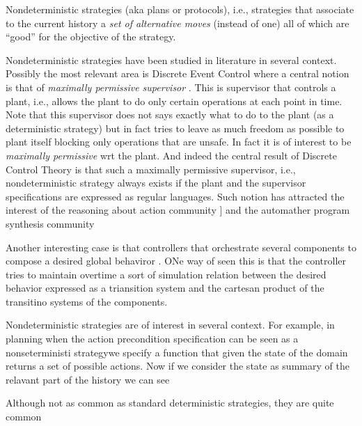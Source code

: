 Nondeterministic strategies (aka plans or protocols), i.e., strategies that associate to the current history a \emph{set of alternative moves} (instead of one) all of which are ``good'' for the objective of the strategy.

Nondeterministic strategies have been studied in literature in several
context.
Possibly the most relevant area is Discrete Event Control where a
central notion is that of \emph{maximally permissive supervisor}
\cite{WonhamRamadge:SIAMJCO87,Cassandras:BOOK06_DES,Wo14}. This is
supervisor that controls a plant, i.e., allows the plant to do only
certain operations at each point in time. Note that this supervisor
does not says exactly what to do to the plant (as a deterministic
strategy) but in fact tries to leave as much freedom as possible to
plant itself blocking only operations that are unsafe. In fact it is
of interest to be \emph{maximally permissive} wrt the plant. And
indeed the central result of Discrete Control Theory is that such a
maximally permissive supervisor, i.e., nondeterministic strategy
always exists if the plant and the supervisor specifications are
expressed as regular languages. Such notion has attracted the interest
of the reasoning about action community
]\cite{DeGiacomoLM12,BanihashemiGL-AAMAS18} and the automather program
synthesis community \cite{pnueli1989synthesisshort,EhlersLTV17}


Another interesting case is that controllers that orchestrate several components to compose a desired global behaviror \cite{Sardina,Logan}. ONe way of seen this is that the controller tries to maintain overtime a sort of simulation relation between the desired behavior expressed as a triansition system and the cartesan product of the transitino systems of the components.


Nondeterministic strategies are of interest in several context. For example, in planning when the action precondition specification can be seen as a nonseterministi strategywe specify a function that given the state of the domain returns a set of possible actions. Now if we consider the state as summary of the relavant part of the history we can see  


Although not as common as standard deterministic strategies, they are quite common


